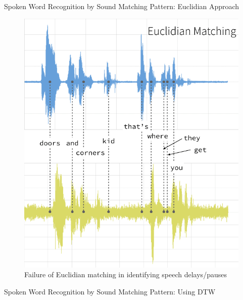 \documentclass[table]{beamer}
\begin{document}

\begin{frame}{Spoken Word Recognition by Sound Matching Pattern: Euclidian Approach}
    \begin{figure}
        \centering
        \includegraphics[width = 0.8\linewidth, height = 0.7\textheight]{EucMat.png}
        \caption{Failure of Euclidian matching in identifying speech delays/pauses}
        \label{fig:my_label_Euclid}
    \end{figure}
\end{frame}


\begin{frame}{Spoken Word Recognition by Sound Matching Pattern: Using DTW }
\centering
{}
\end{frame}
\end{document}
